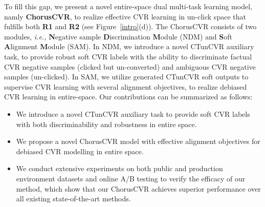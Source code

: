 To fill this gap, we present a novel entire-space dual multi-task learning model, namly \textbf{ChorusCVR}, to realize effective CVR learning in un-click space that  fulfills both \textbf{R1} and \textbf{R2} (see Figure~\ref{intro}(d)).  The ChorusCVR consists of two modules, \emph{i.e.,} \textbf{N}egative sample \textbf{D}iscrimination \textbf{M}odule (NDM) and \textbf{S}oft \textbf{A}lignment \textbf{M}odule (SAM). In NDM, we introduce a novel CTunCVR auxiliary task, to provide robust soft CVR labels with the ability to discriminate factual CVR negative samples (clicked but un-converted) and ambiguous CVR negative samples (un-clicked).  In SAM, we utilize generated CTunCVR soft outputs to supervise  CVR learning with several alignment objectives, to realize debiased CVR learning in entire-space. Our contributions can be summarized as follows:
\begin{itemize}[leftmargin=*,align=left]
    \item We introduce a novel CTunCVR auxiliary task to provide soft CVR labels with both discriminability and robustness in entire space.
    \item We propose a novel ChorusCVR model with effective alignment objectives for debiased CVR modelling in entire space.
    \item We conduct extensive experiments on both public and production environment datasets and online A/B testing to verify the efficacy of our method, which show that our ChorusCVR achieves superior performance over all existing state-of-the-art methods.  
\end{itemize}